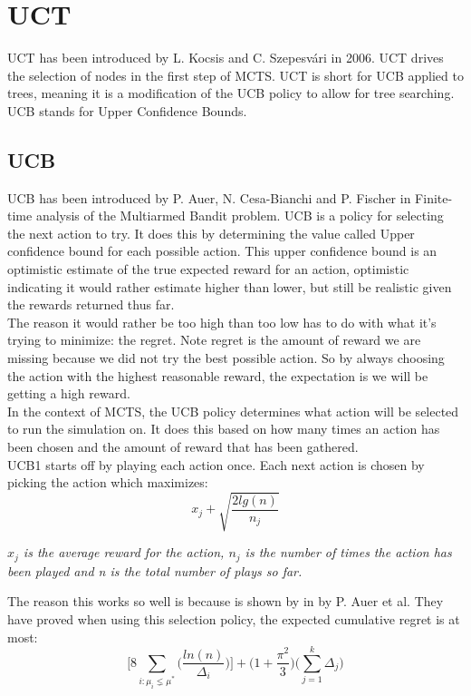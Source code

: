 \documentclass[
11pt, %
english, %
singlespacing, %
headsepline, %
]{MastersDoctoralThesis} %
\begin{document}
\section{UCT}
UCT has been introduced by L. Kocsis and C. Szepesv{\'a}ri in 2006\cite{Kocsis:2006}. UCT drives the selection of nodes in the first step of MCTS. UCT is short for UCB applied to trees, meaning it is a modification of the UCB policy to allow for tree searching. UCB stands for Upper Confidence Bounds.
\subsection{UCB}
UCB has been introduced by P. Auer, N. Cesa-Bianchi and P. Fischer in Finite-time analysis of the Multiarmed Bandit problem\cite{auer2002finite}. UCB is a policy for selecting the next action to try. It does this by determining the value called Upper confidence bound for each possible action. This upper confidence bound is an optimistic estimate of the true expected reward for an action, optimistic indicating it would rather estimate higher than lower, but still be realistic given the rewards returned thus far.\\
The reason it would rather be too high than too low has to do with what it's trying to minimize: the regret. Note regret is the amount of reward we are missing because we did not try the best possible action. So by always choosing the action with the highest reasonable reward, the expectation is we will be getting a high reward.\\
In the context of MCTS, the UCB policy determines what action will be selected to run the simulation on. It does this based on how many times an action has been chosen and the amount of reward that has been gathered.\\

UCB1 starts off by playing each action once. Each next action is chosen by picking the action which maximizes:
\[
    x_j + \sqrt{\dfrac{2 lg(n)}{n_j}}
\]

\textit{$x_j$ is the average reward for the action, $n_j$ is the number of times the action has been played and n is the total number of plays so far.\\}

The reason this works so well is because is shown by in \cite{auer2002finite} by P. Auer et al. They have proved when using this selection policy, the expected cumulative regret is at most: 
\[
    \Bigg[ 8 \sum_{i:\mu_i\lneq\mu^*}\bigg(\dfrac{ln(n)}{\Delta_i}\bigg)\Bigg] + \Bigg( 1 + \dfrac{\pi^2}{3}\Bigg)
    \Bigg(\sum_{j=1}^{k}\Delta_j\Bigg)
\]
\end{document}
